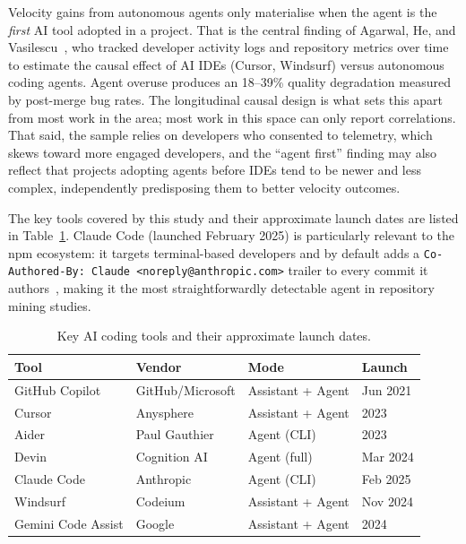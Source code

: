 Velocity gains from autonomous agents only materialise when the agent is the \emph{first} AI tool adopted in a project. That is the central finding of Agarwal, He, and Vasilescu~\cite{agarwal2026}, who tracked developer activity logs and repository metrics over time to estimate the causal effect of AI IDEs (Cursor, Windsurf) versus autonomous coding agents. Agent overuse produces an 18--39\% quality degradation measured by post-merge bug rates. The longitudinal causal design is what sets this apart from most work in the area; most work in this space can only report correlations. That said, the sample relies on developers who consented to telemetry, which skews toward more engaged developers, and the ``agent first'' finding may also reflect that projects adopting agents before IDEs tend to be newer and less complex, independently predisposing them to better velocity outcomes.

The key tools covered by this study and their approximate launch dates are listed in Table~\ref{tab:tools}. Claude Code (launched February 2025) is particularly relevant to the npm ecosystem: it targets terminal-based developers and by default adds a \texttt{Co-Authored-By: Claude <noreply@anthropic.com>} trailer to every commit it authors~\cite{robbesHeuristics2026}, making it the most straightforwardly detectable agent in repository mining studies.

\begin{table}[h]
\centering
\caption{Key AI coding tools and their approximate launch dates.}
\label{tab:tools}
\begin{tabular}{llll}
\hline
\textbf{Tool} & \textbf{Vendor} & \textbf{Mode} & \textbf{Launch} \\
\hline
GitHub Copilot       & GitHub/Microsoft & Assistant + Agent & Jun 2021 \\
Cursor               & Anysphere        & Assistant + Agent & 2023 \\
Aider                & Paul Gauthier    & Agent (CLI)       & 2023 \\
Devin                & Cognition AI     & Agent (full)      & Mar 2024 \\
Claude Code          & Anthropic        & Agent (CLI)       & Feb 2025 \\
Windsurf             & Codeium          & Assistant + Agent & Nov 2024 \\
Gemini Code Assist   & Google           & Assistant + Agent & 2024 \\
\hline
\end{tabular}
\end{table}

